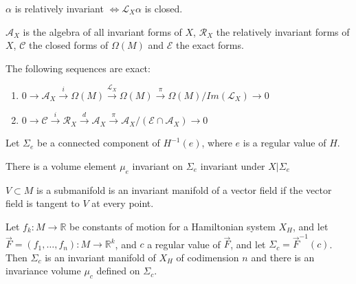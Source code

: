\documentclass{article}
\begin{document}
\begin{defn}

$\alpha$ is relatively invariant $\iff \mathcal{L}_X \alpha$ is closed.

\end{defn}

\begin{defn}

$\mathcal{A}_X$ is the algebra of all invariant forms of $X$, $\mathcal{R}_X$ the relatively invariant forms of $X$, $\mathcal{C}$ the closed forms of $\Omega (M)$ and $\mathcal{E}$ the exact forms.

\end{defn}

\begin{thm}

The following sequences are exact:
\begin{enumerate}
    \item $0 \to \mathcal{A}_X \overset{i}{\to} \Omega(M) \overset{\mathcal{L}_X}{\to} \Omega (M) \overset{\pi}{\to} \Omega (M)/ Im(\mathcal{L}_X) \to 0$
    \item $0 \to \mathcal{C} \overset{i}{\to} \mathcal{R}_X \overset{d}{\to} \mathcal{A}_X \overset{\pi}{\to} \mathcal{A}_X / (\mathcal{E} \cap \mathcal{A}_X ) \to 0$
\end{enumerate}
\end{thm}

Let $\Sigma_e$ be a connected component of $H^{-1}(e)$, where $e$ is a regular value of $H$. 

\begin{thm}
There is a volume element $\mu_e$ invariant on $\Sigma_e$ invariant under $X\vert \Sigma_e$
\end{thm}
\begin{defn}

$V \subset M$ is a submanifold is an invariant manifold of a vector field if the vector field is tangent to $V$ at every point.

\end{defn}

\begin{defn}

Let $f_k:M \to \mathbb{R}$ be constants of motion for a Hamiltonian system $X_H$, and let $\Vec{F} = (f_1, \ldots, f_n): M \to \mathbb{R}^k$, and $c$ a regular value of $\Vec{F}$, and let $\Sigma_c = \Vec{F}^{-1}(c)$. Then $\Sigma_c$ is an invariant manifold of $X_H$ of codimension $n$ and there is an invariance volume $\mu_c$ defined on $\Sigma_c$. 

\end{defn}
\end{document}
